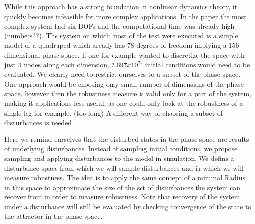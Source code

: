 




    While this approach has a strong foundation in nonlinear dynamics theory, it quickly becomes infeasible for more complex applications. In the paper the most complex system had six DOFs and the computational time was already high (numbers??). 
    The system on which most of the test were executed is a simple model of a quadruped which aready has 78 degrees of freedom implying a 156 dimensional phase space. If one for example wanted to discretize the space with just 3 nodes along each dimension, $2.697x10^74$ initial conditions would need to be evaluated. We clearly need to restrict ourselves to a subset of the phase space. One approach would be choosing only small number of dimensions of the phase space, however then the robustness measure is valid only for a part of the system, making it applications less useful, as one could only look at the robustness of a single leg for example. (too long)
    A different way of choosing a subset of disturbances is needed. 
    
    Here we remind ourselves that the disturbed states in the phase space are results of underlying disturbances. Instead of sampling initial conditions, we propose sampling and applying disturbances to the model in simulation. We define a disturbance space from which we will sample disturbances and in which we will measure robustness. The idea is to apply the same concept of a minimal Radius in this space to approximate the size of the set of disturbances the system can recover from in order to measure robustness. Note that recovery of the system under a disturbance will still be evaluated by checking convergence of the state to the attractor in the phase space. 

